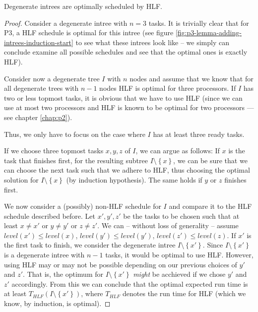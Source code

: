 \begin{theorem}
  Degenerate intrees are optimally scheduled by HLF.
\end{theorem}

\begin{proof}
  Consider a degenerate intree with $n=3$ tasks. It is trivially clear that for P3, a HLF schedule is optimal for this intree (see figure \ref{fig:p3-lemma-adding-intrees-induction-start} to see what these intrees look like -- we simply can conclude examine all possible schedules and see that the optimal ones is exactly HLF).
  
  Consider now a degenerate tree $I$ with $n$ nodes and assume that we know that for all degenerate trees with $n-1$ nodes HLF is optimal for three processors. If $I$ has two or less topmost tasks, it is obvious that we have to use HLF (since we can use at most two processors and HLF is known to be optimal for two processors --- see chapter \ref{chap:p2}).

  Thus, we only have to focus on the case where $I$ has at least three ready tasks.

  If we choose three topmost tasks $x,y,z$ of $I$, we can argue as follows: If $x$ is the task that finishes first, for the resulting subtree $I\setminus \left\{ x \right\}$, we can be sure that we can choose the next task such that we adhere to HLF, thus choosing the optimal solution for $I\setminus\left\{ x \right\}$ (by induction hypothesis). The same holds if $y$ or $z$ finishes first.
  
  We now consider a (possibly) non-HLF schedule for $I$ and compare it to the HLF schedule described before.
  Let $x',y',z'$ be the tasks to be chosen such that at least $x\neq x'$ or $y\neq y'$ or $z\neq z'$. We can -- without loss of generality -- assume $level(x')\leq level(x)$, $level(y')\leq level(y')$, $level(z')\leq level(z)$. If $x'$ is the first task to finish, we consider the degenerate intree $I\setminus\left\{ x' \right\}$. Since $I \setminus \left\{ x' \right\}$ is a degenerate intree with $n-1$ tasks, it would be optimal to use HLF. However, using HLF may or may not be possible depending on our previous choices of $y'$ and $z'$. That is, the optimum for $I\setminus\left\{ x' \right\}$ \emph{might} be acchieved if we chose $y'$ and $z'$ accordingly. From this we can conclude that the optimal expected run time is at least $T_{HLF}\left( I\setminus\left\{ x' \right\} \right)$, where $T_{HLF}$ denotes the run time for HLF (which we know, by induction, is optimal).


\end{proof}
